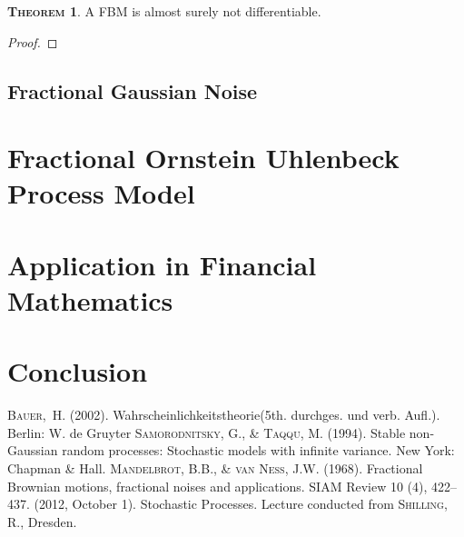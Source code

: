 \documentclass[a4paper, twoside, 11pt]{article}
\theoremstyle{definition}
\newtheorem{theorem}[definition]{\scshape Theorem}
\begin{document}
\begin{theorem}
  A FBM is almost surely not differentiable.
\end{theorem}

\begin{proof}

\end{proof}

\subsection{Fractional Gaussian Noise}
\newpage
\section{Fractional Ornstein Uhlenbeck Process Model}
\setcounter{equation}{0}

\newpage

\section{Application in Financial Mathematics}

\newpage

\section{Conclusion}

\newpage

\fancyhead[LO, RE]{}
\begin{thebibliography}{99}
	 \textsc{Bauer,~H.} (2002). Wahrscheinlichkeitstheorie(5th. durchges. und verb. Aufl.). Berlin: W. de Gruyter
	 \textsc{Samorodnitsky, G., \& Taqqu, M.} (1994). Stable non-Gaussian random processes: Stochastic models with infinite variance. New York: Chapman \& Hall.
	 \textsc{Mandelbrot, B.B., \& van Ness, J.W.} (1968). Fractional Brownian motions, fractional noises and applications. SIAM Review 10 (4), 422–437.
	 (2012, October 1). Stochastic Processes. Lecture conducted from \textsc{Shilling, R.}, Dresden.
\end{thebibliography}
\newpage
\end{document}
